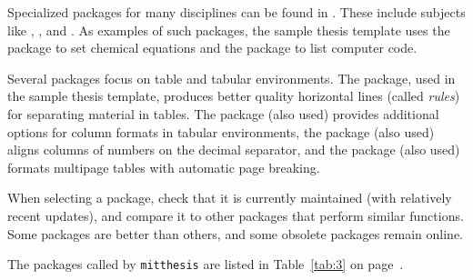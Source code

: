 \documentclass[11pt]{article}
\begin{document}
Specialized packages for many disciplines can be found in .  These include subjects like , , and .  As examples of such packages, the sample thesis template uses the package \texttt{} to set chemical equations and the package \texttt{} to list computer code.

Several packages focus on table and tabular environments.  The \texttt{} package, used in the sample thesis template, produces better quality horizontal lines (called \textit{rules}) for separating material in tables.  The \texttt{} package (also used) provides additional options for column formats in tabular environments, the \texttt{} package (also used) aligns columns of numbers on the decimal separator, and the \texttt{} package (also used) formats multipage tables with automatic page breaking.

When selecting a package, check that it is currently maintained (with relatively recent updates), and compare it to other packages that perform similar functions.  Some packages are better than others, and some obsolete packages remain online.

The packages called by \texttt{mitthesis} are listed in Table~\ref{tab:3} on page~\pageref{tab:3}.
\end{document}
